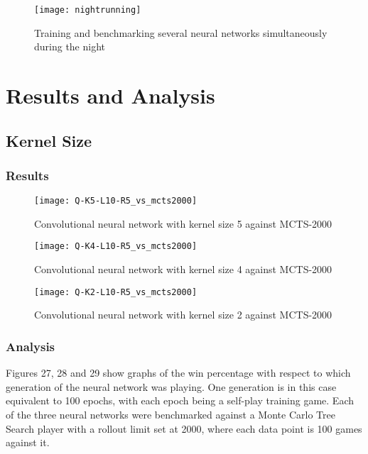 \documentclass[titlepage]{article}
\begin{document}
\vskip 2cm

\begin{figure}[h]
    \center
    \texttt{[image: nightrunning]}
    \caption{Training and benchmarking several neural networks simultaneously during the night}
\end{figure}

\newpage

\section{Results and Analysis}

\subsection{Kernel Size}

\subsubsection{Results}

\vskip -0.7cm

\begin{figure}[h]
    \center
    \texttt{[image: Q-K5-L10-R5\_vs\_mcts2000]}
    \caption{Convolutional neural network with kernel size 5 against MCTS-2000}
\end{figure}

\begin{figure}[h]
    \center
    \texttt{[image: Q-K4-L10-R5\_vs\_mcts2000]}
    \caption{Convolutional neural network with kernel size 4 against MCTS-2000}
\end{figure}

\newpage

\begin{figure}[h]
    \center
    \texttt{[image: Q-K2-L10-R5\_vs\_mcts2000]}
    \caption{Convolutional neural network with kernel size 2 against MCTS-2000}
\end{figure}

\subsubsection{Analysis}

\vskip 0.5cm

Figures 27, 28 and 29 show graphs of the win percentage with respect to which generation of the neural network was playing. One generation is in this case equivalent to 100 epochs, with each epoch being a self-play training game. Each of the three neural networks were benchmarked against a Monte Carlo Tree Search player with a rollout limit set at 2000, where each data point is 100 games against it.
\end{document}
